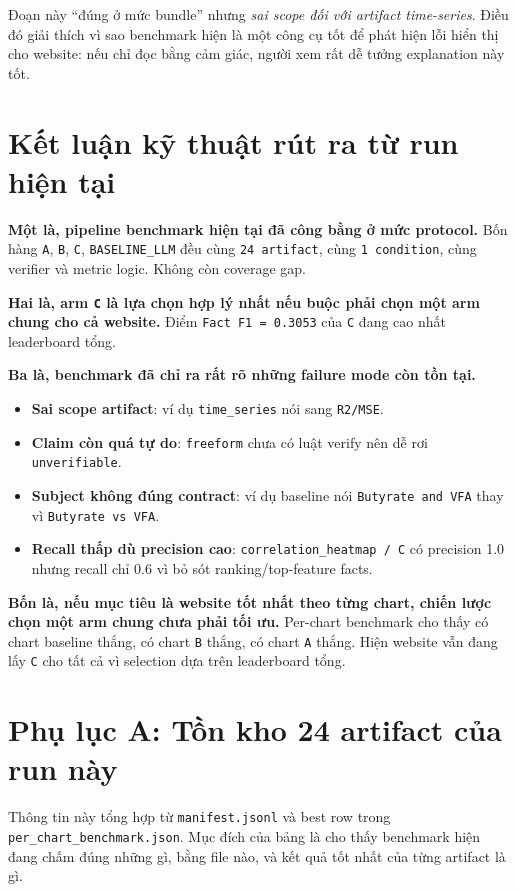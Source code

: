 \documentclass[11pt,a4paper]{article}
\newcommand{\field}[1]{\texttt{#1}}
\begin{document}
Đoạn này ``đúng ở mức bundle'' nhưng \emph{sai scope đối với artifact time-series}. Điều đó giải thích vì sao benchmark hiện là một công cụ tốt để phát hiện lỗi hiển thị cho website: nếu chỉ đọc bằng cảm giác, người xem rất dễ tưởng explanation này tốt.

\section{Kết luận kỹ thuật rút ra từ run hiện tại}

\textbf{Một là, pipeline benchmark hiện tại đã công bằng ở mức protocol.}
Bốn hàng \field{A}, \field{B}, \field{C}, \field{BASELINE\_LLM} đều cùng
\field{24 artifact}, cùng \field{1 condition}, cùng verifier và metric logic. Không còn coverage gap.

\textbf{Hai là, arm \field{C} là lựa chọn hợp lý nhất nếu buộc phải chọn một arm chung cho cả website.}
Điểm \field{Fact F1 = 0.3053} của \field{C} đang cao nhất leaderboard tổng.

\textbf{Ba là, benchmark đã chỉ ra rất rõ những failure mode còn tồn tại.}
\begin{itemize}
  \item \textbf{Sai scope artifact}: ví dụ \field{time\_series} nói sang \field{R2/MSE}.
  \item \textbf{Claim còn quá tự do}: \field{freeform} chưa có luật verify nên dễ rơi \field{unverifiable}.
  \item \textbf{Subject không đúng contract}: ví dụ baseline nói \field{Butyrate and VFA} thay vì \field{Butyrate vs VFA}.
  \item \textbf{Recall thấp dù precision cao}: \field{correlation\_heatmap / C} có precision 1.0 nhưng recall chỉ 0.6 vì bỏ sót ranking/top-feature facts.
\end{itemize}

\textbf{Bốn là, nếu mục tiêu là website tốt nhất theo từng chart, chiến lược chọn một arm chung chưa phải tối ưu.}
Per-chart benchmark cho thấy có chart baseline thắng, có chart \field{B} thắng, có chart \field{A} thắng. Hiện website vẫn đang lấy \field{C} cho tất cả vì selection dựa trên leaderboard tổng.

\appendix

\section{Phụ lục A: Tồn kho 24 artifact của run này}
Thông tin này tổng hợp từ \field{manifest.jsonl} và best row trong \field{per\_chart\_benchmark.json}. Mục đích của bảng là cho thấy benchmark hiện đang chấm đúng những gì, bằng file nào, và kết quả tốt nhất của từng artifact là gì.
\end{document}
